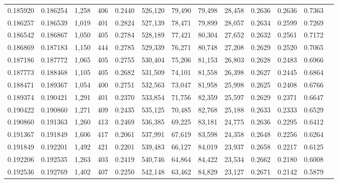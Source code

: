 \begin{tabular}{rrrrrrrrrrrrr}
0.185920 & 0.186254 & 1,258 & 406 &                                     0.2440 & 526,120 &  79,490 &  79,498 &  28,458 & 0.2636 & 0.2636 & 0.7363 \\
0.186257 & 0.186539 & 1,019 & 401 &                                     0.2824 & 527,139 &  78,471 &  79,899 &  28,057 & 0.2634 & 0.2599 & 0.7269 \\
0.186542 & 0.186867 & 1,050 & 405 &                                     0.2784 & 528,189 &  77,421 &  80,304 &  27,652 & 0.2632 & 0.2561 & 0.7172 \\
0.186869 & 0.187183 & 1,150 & 444 &                                     0.2785 & 529,339 &  76,271 &  80,748 &  27,208 & 0.2629 & 0.2520 & 0.7065 \\
0.187186 & 0.187772 & 1,065 & 405 &                                     0.2755 & 530,404 &  75,206 &  81,153 &  26,803 & 0.2628 & 0.2483 & 0.6966 \\
0.187773 & 0.188468 & 1,105 & 405 &                                     0.2682 & 531,509 &  74,101 &  81,558 &  26,398 & 0.2627 & 0.2445 & 0.6864 \\
0.188471 & 0.189367 & 1,054 & 400 &                                     0.2751 & 532,563 &  73,047 &  81,958 &  25,998 & 0.2625 & 0.2408 & 0.6766 \\
0.189374 & 0.190421 & 1,291 & 401 &                                     0.2370 & 533,854 &  71,756 &  82,359 &  25,597 & 0.2629 & 0.2371 & 0.6647 \\
0.190422 & 0.190860 & 1,271 & 409 &                                     0.2435 & 535,125 &  70,485 &  82,768 &  25,188 & 0.2633 & 0.2333 & 0.6529 \\
0.190860 & 0.191363 & 1,260 & 413 &                                     0.2469 & 536,385 &  69,225 &  83,181 &  24,775 & 0.2636 & 0.2295 & 0.6412 \\
0.191367 & 0.191849 & 1,606 & 417 &                                     0.2061 & 537,991 &  67,619 &  83,598 &  24,358 & 0.2648 & 0.2256 & 0.6264 \\
0.191849 & 0.192201 & 1,492 & 421 &                                     0.2201 & 539,483 &  66,127 &  84,019 &  23,937 & 0.2658 & 0.2217 & 0.6125 \\
0.192206 & 0.192535 & 1,263 & 403 &                                     0.2419 & 540,746 &  64,864 &  84,422 &  23,534 & 0.2662 & 0.2180 & 0.6008 \\
0.192536 & 0.192769 & 1,402 & 407 &                                     0.2250 & 542,148 &  63,462 &  84,829 &  23,127 & 0.2671 & 0.2142 & 0.5879 \\

\end{tabular}
